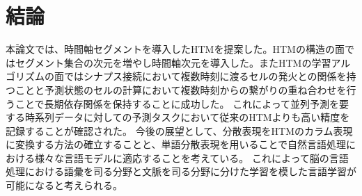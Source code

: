 \chapter{結論}
本論文では、時間軸セグメントを導入したHTMを提案した。HTMの構造の面ではセグメント集合の次元を増やし時間軸次元を導入した。またHTMの学習アルゴリズムの面ではシナプス接続において複数時刻に渡るセルの発火との関係を持つことと予測状態のセルの計算において複数時刻からの繋がりの重ね合わせを行うことで長期依存関係を保持することに成功した。
これによって並列予測を要する時系列データに対しての予測タスクにおいて従来のHTMよりも高い精度を記録することが確認された。
今後の展望として、分散表現をHTMのカラム表現に変換する方法の確立することと、単語分散表現を用いることで自然言語処理における様々な言語モデルに適応することを考えている。
これによって脳の言語処理における語彙を司る分野と文脈を司る分野に分けた学習を模した言語学習が可能になると考えられる。
